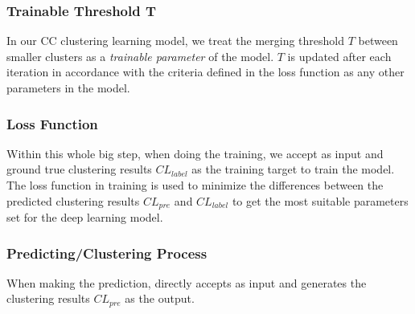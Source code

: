 \subsubsection*{Trainable Threshold T} In our CC clustering learning model,
we treat the merging threshold $T$ between smaller clusters as a {\em
  trainable parameter} of the model. $T$ is updated after each
iteration in accordance with the criteria defined in the loss function
as any other parameters in the model.




\subsubsection*{Loss Function}

Within this whole big step, when doing the training, we accept {\mvpdg} as input and ground true clustering results $CL_{label}$ as the training target to train the model. The loss function in training is used to minimize the differences between the predicted clustering results $CL_{pre}$ and $CL_{label}$ to get the most suitable parameters set for the deep learning model. 

\subsubsection*{Predicting/Clustering Process}
When making the prediction, \tool directly accepts {\mvpdg} as input
and generates the clustering results $CL_{pre}$ as the output.

